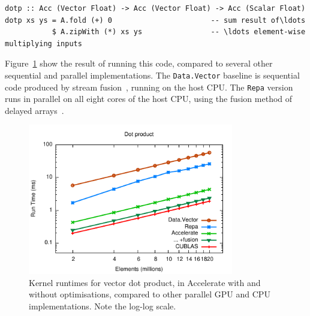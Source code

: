 \begin{lstlisting}[style=haskell_float
    ,label=lst:dotp
    ,caption={Vector dot-product}]
dotp :: Acc (Vector Float) -> Acc (Vector Float) -> Acc (Scalar Float)
dotp xs ys = A.fold (+) 0                       -- sum result of\ldots
           $ A.zipWith (*) xs ys                -- \ldots element-wise multiplying inputs
\end{lstlisting}

Figure~\ref{fig:dotp} show the result of running this code, compared to several
other sequential and parallel implementations. The \texttt{Data.Vector} baseline
is sequential code produced by stream
fusion~\cite{Coutts:2007kp}, running on the host CPU. The \texttt{Repa} version
runs in parallel on all eight cores of the host CPU, using the fusion method of
delayed arrays~\cite{Keller:2010er}.

\begin{figure}
    \begin{center}
        \includegraphics[width=0.8\textwidth]{images/sec-6/dotp/dotp}
    \end{center}
    \caption[Vector dot product kernel benchmarks]{Kernel runtimes for vector
        dot product, in Accelerate with and without optimisations, compared to
        other parallel GPU and CPU implementations. Note the log-log scale.}
    \label{fig:dotp}
\end{figure}

